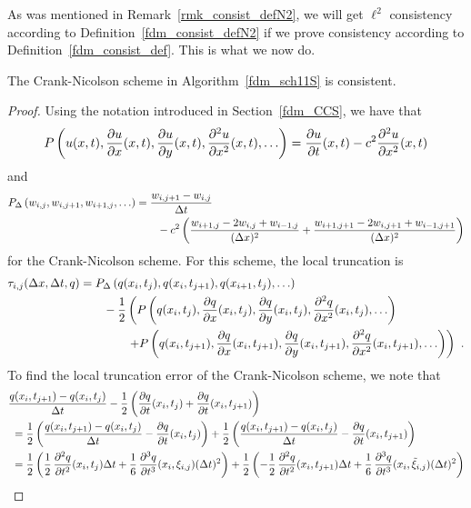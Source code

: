 As was mentioned in Remark~\ref{rmk_consist_defN2}, we will get
$\ell^2$ consistency according to Definition~\ref{fdm_consist_defN2}
if we prove consistency according to Definition~\ref{fdm_consist_def}.
This is what we now do.

\begin{prop}
The Crank-Nicolson scheme in Algorithm~\ref{fdm_sch11S} is consistent.
\end{prop}

\begin{proof}
Using the notation introduced in Section~\ref{fdm_CCS}, we have that
\[
P\left(u(x,t), \frac{\partial{u}}{\partial{x}}(x,t), \frac{\partial{u}}{\partial{y}}(x,t),
  \frac{\partial^{2}{u}}{\partial{x}^{2}}(x,t), \ldots \right)
= \frac{\partial{u}}{\partial{t}}(x,t) - c^2 \frac{\partial^{2}{u}}{\partial{x}^{2}}(x,t)
\]
and
\begin{align*}
P_\Delta\left(w_{i,j}, w_{i,j+1}, w_{i+1,j}, \ldots\right)
&= \frac{w_{i,j+1} - w_{i,j}}{\Delta{t}} \\
& \qquad - c^2 \left( \frac{w_{i+1,j} - 2w_{i,j} + w_{i-1,j}}{(\Delta{x})^2}
+ \frac{w_{i+1,j+1} - 2w_{i,j+1} + w_{i-1,j+1}}{(\Delta{x})^2} \right)
\end{align*}
for the Crank-Nicolson scheme.  For this scheme, the local truncation is
\begin{align*}
\tau_{i,j}(\Delta{x},\Delta{t},q)
&= P_\Delta\left(q(x_i,t_j), q(x_i,t_{j+1}), q(x_{i+1},t_j), \ldots\right) \\
&\qquad -
\frac{1}{2} \left(
P\left(q(x_i,t_j), \frac{\partial{q}}{\partial{x}}(x_i,t_j), \frac{\partial{q}}{\partial{y}}(x_i,t_j),
\frac{\partial^{2}{q}}{\partial{x}^{2}}(x_i,t_j), \ldots \right) \right. \\
& \left.
\qquad\qquad + P\left(q(x_i,t_{j+1}), \frac{\partial{q}}{\partial{x}}(x_i,t_{j+1}),
\frac{\partial{q}}{\partial{y}}(x_i,t_{j+1}), \frac{\partial^{2}{q}}{\partial{x}^{2}}(x_i,t_{j+1}), \ldots \right)
\right) \ .
\end{align*}
To find the local truncation error of the Crank-Nicolson scheme, we
note that
\begin{align*}
&\frac{q(x_i,t_{j+1})-q(x_i,t_j)}{\dtx{t}} -
\frac{1}{2} \left( \pdydx{q}{t}(x_i,t_j) + \pdydx{q}{t}(x_i,t_{j+1}) \right) \\
&\ = \frac{1}{2}  \left( \frac{q(x_i,t_{j+1})-q(x_i,t_j)}{\dtx{t}} -
\pdydx{q}{t}(x_i,t_j) \right)
+ \frac{1}{2} \left( \frac{q(x_i,t_{j+1})-q(x_i,t_j)}{\dtx{t}}
- \pdydx{q}{t}(x_i,t_{j+1}) \right) \\
& \ = \frac{1}{2} \left( \frac{1}{2}\, \pdydxn{q}{t}{2}(x_i,t_j) \dtx{t}
+ \frac{1}{6}\, \pdydxn{q}{t}{3}(x_i,\xi_{i,j}) (\dtx{t})^2 \right)
+\frac{1}{2} \left( - \frac{1}{2}\, \pdydxn{q}{t}{2}(x_i,t_{j+1}) \dtx{t}
+ \frac{1}{6}\, \pdydxn{q}{t}{3}(x_i,\tilde{\xi}_{i,j}) (\dtx{t})^2 \right) \\

\end{align*}
\end{proof}
